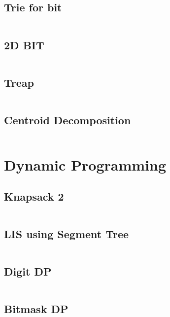 \subsection{\small Trie for bit  \scriptsize}
\inputminted[breaklines, breakanywhere]{c++}{code/05-Data Structure/24-Trie for bit.cpp}

\subsection{\small 2D BIT  \scriptsize}
\inputminted[breaklines, breakanywhere]{c++}{code/05-Data Structure/25-2D BIT.cpp}

\subsection{\small Treap  \scriptsize}
\inputminted[breaklines, breakanywhere]{c++}{code/05-Data Structure/27-Treap.cpp}

\subsection{\small Centroid Decomposition  \scriptsize}
\inputminted[breaklines, breakanywhere]{c++}{code/05-Data Structure/28-Centroid Decomposition.cpp}

\section{Dynamic Programming}
\subsection{\small Knapsack 2  \scriptsize}
\inputminted[breaklines, breakanywhere]{c++}{code/06-Dynamic Programming/01-Knapsack 2.cpp}

\subsection{\small LIS using Segment Tree  \scriptsize}
\inputminted[breaklines, breakanywhere]{c++}{code/06-Dynamic Programming/02-LIS using Segment Tree.cpp}

\subsection{\small Digit DP  \scriptsize}
\inputminted[breaklines, breakanywhere]{c++}{code/06-Dynamic Programming/03-Digit DP.cpp}

\subsection{\small Bitmask DP  \scriptsize}
\inputminted[breaklines, breakanywhere]{c++}{code/06-Dynamic Programming/04-Bitmask DP.cpp}

